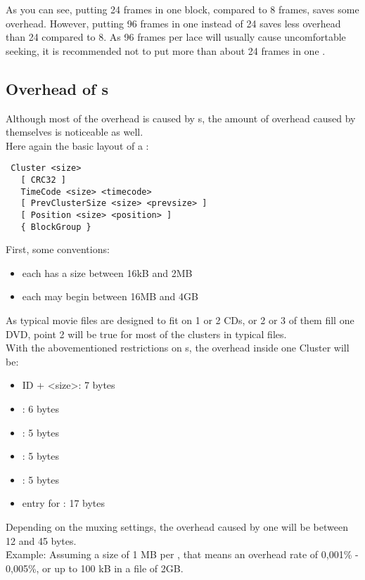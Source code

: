 \documentclass[12pt]{article}
\begin{document}
As you can see, putting 24 frames in one block, compared to 8 frames,
saves some overhead. However, putting 96 frames in one  instead of
24 saves less overhead than 24 compared to 8. As 96 frames per lace will
usually cause uncomfortable seeking, it is recommended not to put more than
about 24 frames in one .
\newpage
\subsection{Overhead of s}
Although most of the overhead is caused by s, the amount of overhead
caused by  themselves is noticeable as well.\\[0.2cm]
Here again the basic layout of a :
\begin{verbatim} Cluster <size>
   [ CRC32 ] 
   TimeCode <size> <timecode>
   [ PrevClusterSize <size> <prevsize> ]
   [ Position <size> <position> ]
   { BlockGroup }
\end{verbatim}   
First, some conventions:
\begin{itemize} \item each  has a size between 16kB and 2MB
\item each  may begin between 16MB and 4GB
\end{itemize}
As typical movie files are designed to fit on 1 or 2 CDs, or 2 or 3 of
them fill one DVD, point 2 will be true for most of the clusters in 
typical files.\\[0.2cm]
With the abovementioned restrictions on s, the overhead
inside one Cluster will be:
\begin{itemize}
\item {} ID + <size>: 7 bytes
\item {}: 6 bytes
\item {}: 5 bytes
\item {}: 5 bytes
\item {}: 5 bytes
\item {} entry for : 17 bytes
\end{itemize}
Depending on the muxing settings, the overhead caused by one 
will be between 12 and 45 bytes. \\[0.2cm]
\f{Example}: Assuming a size of 1 MB per ,
that means an overhead rate of 0,001\% - 0,005\%, or up to 100 kB in a file of 2GB.
\newpage
\end{document}
